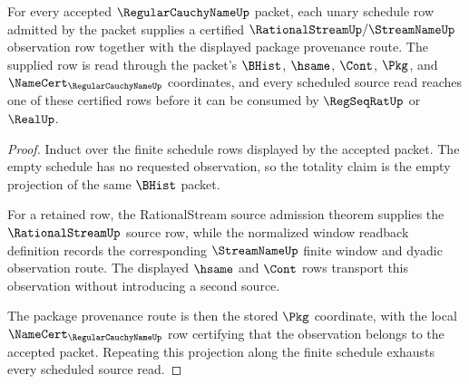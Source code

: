 \begin{theorem}
\label{thm:regularcauchyname-scheduled-observation-source-totality}
For every accepted $\RegularCauchyNameUp$ packet, each unary schedule row admitted by the packet supplies a certified $\RationalStreamUp/\StreamNameUp$ observation row together with the displayed package provenance route. The supplied row is read through the packet's $\BHist$, $\hsame$, $\Cont$, $\Pkg$, and $\NameCert_{\RegularCauchyNameUp}$ coordinates, and every scheduled source read reaches one of these certified rows before it can be consumed by $\RegSeqRatUp$ or $\RealUp$.
\end{theorem}
\begin{proof}
Induct over the finite schedule rows displayed by the accepted packet. The empty schedule has no requested observation, so the totality claim is the empty projection of the same $\BHist$ packet.

For a retained row, the RationalStream source admission theorem supplies the $\RationalStreamUp$ source row, while the normalized window readback definition records the corresponding $\StreamNameUp$ finite window and dyadic observation route. The displayed $\hsame$ and $\Cont$ rows transport this observation without introducing a second source.

The package provenance route is then the stored $\Pkg$ coordinate, with the local $\NameCert_{\RegularCauchyNameUp}$ row certifying that the observation belongs to the accepted packet. Repeating this projection along the finite schedule exhausts every scheduled source read.
\end{proof}

